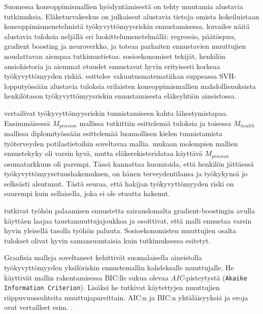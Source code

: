 Suomessa koneoppimismallien hyödyntämisestä on tehty muutamia alustavia tutkimuksia. Eläketurvakeskus on julkaissut alustavia tietoja omista kokeiluistaan koneoppimismenetelmistä työkyvyttömyysriskin ennustamisessa. \citet{varis_aketurvakeskuksen_2018} kuvailee näitä alustavia tuloksia neljällä eri luokittelumenetelmällä: regressio, päätöspuu, gradient boosting \citep{friedman_greedy_2001} ja neuroverkko, ja toteaa parhaiten ennustavien muuttujien noudattavan aiempaa tutkimustietoa: sosioekonomiset tekijät, henkilön ansiohistoria ja aiemmat etuudet ennustavat hyvin erityisesti korkeaa työkyvyttömyyden riskiä. \citet{sami_tyokyvyttomyyselakeratkaisun_2022} esittelee vakuutusmatematiikan suppeassa SVH-lopputyössään alustavia tuloksia erilaisten koneoppimismallien mahdollisuuksista henkilötason työkyvyttömyysriskin ennustamisesta eläkeyhtiön aineistossa.

\citet{saarela_work_2022} vertailivat työkyvyttömyysriskin tunnistamiseen kahta lähestymistapaa. Ensimmäisessä $M_{pension}$ mallissa tutkittiin \citet{varis_aketurvakeskuksen_2018} esittelemiä tuloksia ja toisessa $M_{health}$ mallissa \citet{huhta-koivisto_work_2020} diplomityössään esittelemää luonnollisen kielen tunnistamista työterveyden potilastietoihin soveltavaa mallia. \citet{saarela_work_2022} mukaan molempien mallien ennustekyky oli varsin hyvä, mutta eläkerekisteridataa käyttävä $M_{pension}$ osumatarkkuus oli parempi. Tässä kannattaa huomioida, että henkilön jättäessä työkyvyttömyysetuushakemuksen, on hänen terveydentilansa ja työkykynsä jo selkeästi alentunut. Tästä seuraa, että hakijan työkyvyttömyyden riski on suurempi kuin sellaisella, joka ei ole etuutta hakenut. 

\citet{na_machine_nodate} tutkivat työhön palaamisen ennustetta sairauslomalta gradient-boostingin avulla käyttäen laajaa taustamuuttujajoukkoa ja osoittivat, että malli ennustaa varsin hyvin yleisellä tasolla työhön paluuta. Sosioekonomisten muuttujien osalta tulokset olivat hyvin samansuuntaisia kuin \citet{karolaakso_contextual_2021, karolaakso_socioeconomic_2020} tutkimuksessa esitetyt. 

Graafisia malleja soveltaneet \citet{airaksinen_development_2017} kehittivät suomalaisella aineistolla työkyvyttömyyden yksilöriskin ennustemallin kahdeksalle muuttujalle. He käyttivät mallin rakentamisessa BIC:lle sukua olevaa \emph{AIC}-pisteytystä (\texttt{Akaike Information Criterion}). Lisäksi he tutkivat käytettyjen muuttujien riippuvuussuhteita muuttujapareittain. AIC:n ja BIC:n yhtäläisyyksiä ja eroja ovat vertailleet esim. \citet{ding_model_2018}.

